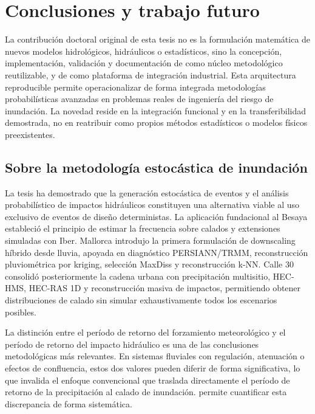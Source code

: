 \chapter{Conclusiones y trabajo futuro}
\label{ch:conclusiones}

La contribución doctoral original de esta tesis no es la formulación matemática de nuevos modelos hidrológicos, hidráulicos o estadísticos, sino la concepción, implementación, validación y documentación de \pyhydra como núcleo metodológico reutilizable, y de \hydra como plataforma de integración industrial. Esta arquitectura reproducible permite operacionalizar de forma integrada metodologías probabilísticas avanzadas en problemas reales de ingeniería del riesgo de inundación. La novedad reside en la integración funcional y en la transferibilidad demostrada, no en reatribuir como propios métodos estadísticos o modelos físicos preexistentes.

\section{Sobre la metodología estocástica de inundación}

La tesis ha demostrado que la generación estocástica de eventos y el análisis probabilístico de impactos hidráulicos constituyen una alternativa viable al uso exclusivo de eventos de diseño deterministas. La aplicación fundacional al Besaya \parencite{navas2018besaya} estableció el principio de estimar la frecuencia sobre calados y extensiones simuladas con Iber. Mallorca \parencite{navas2019mallorca} introdujo la primera formulación de downscaling híbrido desde lluvia, apoyada en diagnóstico PERSIANN/TRMM, reconstrucción pluviométrica por kriging, selección MaxDiss y reconstrucción k-NN. Calle 30 \parencite{navas2024calle30} consolidó posteriormente la cadena urbana con precipitación multisitio, HEC-HMS, HEC-RAS 1D y reconstrucción masiva de impactos, permitiendo obtener distribuciones de calado sin simular exhaustivamente todos los escenarios posibles.

La distinción entre el período de retorno del forzamiento meteorológico y el período de retorno del impacto hidráulico es una de las conclusiones metodológicas más relevantes. En sistemas fluviales con regulación, atenuación o efectos de confluencia, estos dos valores pueden diferir de forma significativa, lo que invalida el enfoque convencional que traslada directamente el período de retorno de la precipitación al calado de inundación. \hydra permite cuantificar esta discrepancia de forma sistemática.

